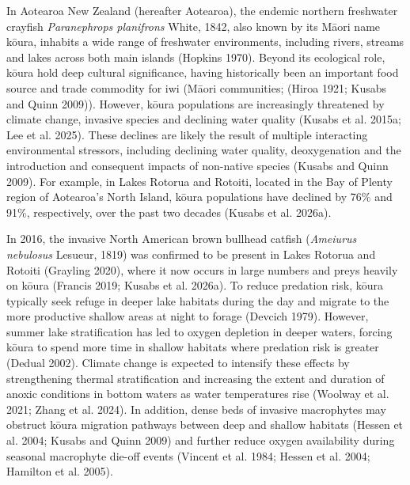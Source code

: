 \documentclass[
  12pt,
  a4paper,
  oneside]{scrbook}
\begin{document}
In Aotearoa New Zealand (hereafter Aotearoa), the endemic northern
freshwater crayfish \emph{Paranephrops planifrons} White, 1842, also
known by its Māori name kōura, inhabits a wide range of freshwater
environments, including rivers, streams and lakes across both main
islands (Hopkins 1970). Beyond its ecological role, kōura hold deep
cultural significance, having historically been an important food source
and trade commodity for iwi (Māori communities; (Hiroa 1921; Kusabs and
Quinn 2009)). However, kōura populations are increasingly threatened by
climate change, invasive species and declining water quality (Kusabs et
al. 2015a; Lee et al. 2025). These declines are likely the result of
multiple interacting environmental stressors, including declining water
quality, deoxygenation and the introduction and consequent impacts of
non-native species (Kusabs and Quinn 2009). For example, in Lakes
Rotorua and Rotoiti, located in the Bay of Plenty region of Aotearoa's
North Island, kōura populations have declined by 76\% and 91\%,
respectively, over the past two decades (Kusabs et al. 2026a).

In 2016, the invasive North American brown bullhead catfish
(\emph{Ameiurus nebulosus} Lesueur, 1819) was confirmed to be present in
Lakes Rotorua and Rotoiti (Grayling 2020), where it now occurs in large
numbers and preys heavily on kōura (Francis 2019; Kusabs et al. 2026a).
To reduce predation risk, kōura typically seek refuge in deeper lake
habitats during the day and migrate to the more productive shallow areas
at night to forage (Devcich 1979). However, summer lake stratification
has led to oxygen depletion in deeper waters, forcing kōura to spend
more time in shallow habitats where predation risk is greater (Dedual
2002). Climate change is expected to intensify these effects by
strengthening thermal stratification and increasing the extent and
duration of anoxic conditions in bottom waters as water temperatures
rise (Woolway et al. 2021; Zhang et al. 2024). In addition, dense beds
of invasive macrophytes may obstruct kōura migration pathways between
deep and shallow habitats (Hessen et al. 2004; Kusabs and Quinn 2009)
and further reduce oxygen availability during seasonal macrophyte
die-off events (Vincent et al. 1984; Hessen et al. 2004; Hamilton et al.
2005).
\end{document}

